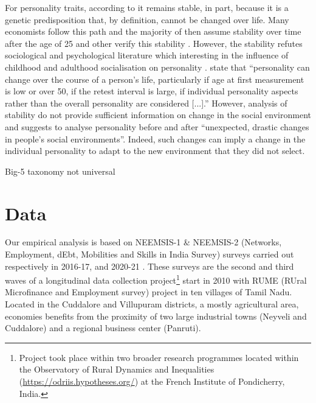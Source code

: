 \documentclass[a4paper, 12pt, onecolumn]{article}
\begin{document}
For personality traits, according to \cite{Costa1997, McCrae2000} it remains stable, in part, because it is a genetic predisposition that, by definition, cannot be changed over life.
Many economists follow this path and the majority of then assume stability over time after the age of 25 \citep{CobbClark2012} and other verify this stability \citep{CobbClark2011}.
However, the stability refutes sociological and psychological literature which interesting in the influence of childhood and adulthood socialisation on personality \citep{Mortimer1978, Moen1995}.
\cite{Ardelt2000} state that ``personality can change over the course of a person's life, particularly if age at first measurement is low or over 50, if the retest interval is large, if individual personality aspects rather than the overall personality are considered [...].''
However, analysis of stability do not provide sufficient information on change in the social environment and \cite{Ardelt2000} suggests to analyse personality before and after ``unexpected, drastic changes in people's social environments''.
Indeed, such changes can imply a change in the individual personality to adapt to the new environment that they did not select.

Big-5 taxonomy not universal \cite{Gurven2013}


\clearpage
\newpage
\section{Data}
\label{section:data}

Our empirical analysis is based on NEEMSIS-1 \& NEEMSIS-2 (Networks, Employment, dEbt, Mobilities and Skills in India Survey) surveys carried out respectively in 2016-17, and 2020-21 \citep{NEEMSISreport, NEEMSIS2017}.
These surveys are the second and third waves of a longitudinal data collection project\footnote{Project took place within two broader research programmes located within the Observatory of Rural Dynamics and Inequalities (\url{https://odriis.hypotheses.org/}) at the French Institute of Pondicherry, India.} start in 2010 with RUME (RUral Microfinance and Employment survey) project in ten villages of Tamil Nadu.
Located in the Cuddalore and Villupuram districts, a mostly agricultural area, economies benefits from the proximity of two large industrial towns (Neyveli and Cuddalore) and a regional business center (Panruti).
\end{document}
